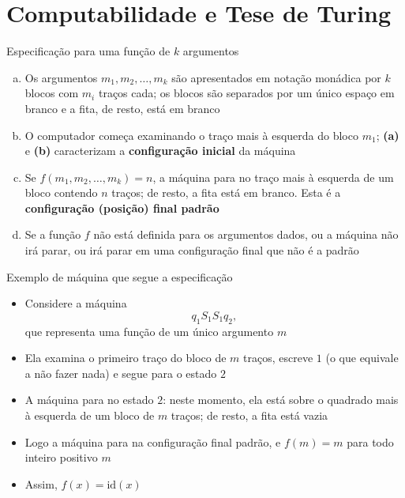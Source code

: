 \section{Computabilidade e Tese de Turing}

\begin{frame}[fragile]{Especificação para uma função de $k$ argumentos}

    \begin{enumerate}[(a)]
        \item Os argumentos $m_1, m_2, \ldots, m_k$ são apresentados em notação monádica por
            $k$ blocos com $m_i$ traços cada; os blocos são separados por um único espaço em branco
            e a fita, de resto, está em branco
        \item O computador começa examinando o traço mais à esquerda do bloco $m_1$; \textbf{(a)}
            e \textbf{(b)} caracterizam a \textbf{configuração inicial} da máquina
        \item Se $f(m_1, m_2, \ldots, m_k) = n$, a máquina para no traço mais à esquerda de um
            bloco contendo $n$ traços; de resto, a fita está em branco. Esta é a 
            \textbf{configuração (posição) final padrão}
        \item Se a função $f$ não está definida para os argumentos dados, ou a máquina não irá
            parar, ou irá parar em uma configuração final que não é a padrão
    \end{enumerate}

\end{frame}

\begin{frame}[fragile]{Exemplo de máquina que segue a especificação}

    \begin{itemize}
        \item Considere a máquina
        \[
            q_1S_1S_1q_2,
        \]
        que representa uma função de um único argumento $m$

        \item Ela examina o primeiro traço do bloco de $m$ traços, escreve $1$ (o que equivale
            a não fazer nada) e segue para o estado $2$

        \item A máquina para no estado $2$: neste momento, ela está sobre o quadrado mais à
            esquerda de um bloco de $m$ traços; de resto, a fita está vazia

        \item Logo a máquina para na configuração final padrão, e $f(m) = m$ para todo inteiro
            positivo $m$

        \item Assim, $f(x) = \mathrm{id}(x)$
    \end{itemize}

\end{frame}

